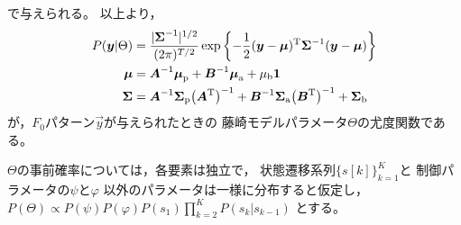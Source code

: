 で与えられる。
以上より，
\begin{align}
P(\Vec{y}|{\Theta})
&=
\frac{|\Mat{\Sigma}^{-1}|^{1/2}}{(2\pi)^{T/2}}
\exp
\left\{
-\frac{1}{2}
(\Vec{y}-\Vec{\mu})^{\rm T}
\Mat{\Sigma}^{-1}
(\Vec{y}-\Vec{\mu})
\right\}
\nonumber\\
\Vec{\mu}&=\Mat{A}^{-1}\Vec{\mu}_{\rm p}+\Mat{B}^{-1}\Vec{\mu}_{\rm a}+\mu_{\rm b}\Vec{1}
\label{eq:likelihood_fujisaki}
\\
\Mat{\Sigma}&=
\Mat{A}^{-1}
\Mat{\Sigma}_{\rm p}
\big(\Mat{A}^{\rm T}\big)^{-1}
+
\Mat{B}^{-1}
\Mat{\Sigma}_{\rm a}
\big(\Mat{B}^{\rm T}\big)^{-1}
+
\Mat{\Sigma}_{\rm b}
\nonumber
\end{align}
が，$F_0$パターン$\Vec{y}$が与えられたときの
藤崎モデルパラメータ$\Theta$の尤度関数である。

$\Theta$の事前確率については，各要素は独立で，
状態遷移系列$\{s[k]\}_{k=1}^{K}$と
制御パラメータの$\psi$と$\varphi$
以外のパラメータは一様に分布すると仮定し，
$P(\Theta)\propto
P(\psi)
P(\varphi)
P(s_{1})\prod_{k=2}^{K}
P(s_{k}|s_{k-1})$
とする。




